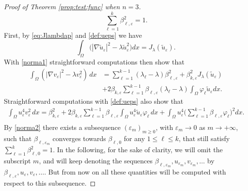 \documentclass[10pt]{amsart}
\numberwithin{equation}{section}
\newcommand{\ve}{\varepsilon}
\newcommand{\vp}{\varphi}
\newcommand{\Om}{\Omega}
\theoremstyle{plain}
\theoremstyle{remark}
\begin{document}
\begin{proof}[Proof of Theorem \ref{prop:test:func} when $n=3$]
\begin{equation} \label{norma2}
\sum_{\ell=1}^{k}\beta_{\ell,\ve}^2=1.
\end{equation}
First, by \eqref{eq:Jlambdap} and \eqref{def:ueps}  we have 
$$  \int_{\Omega}\big( |\nabla \tilde{u}_\ve|^2 - \lambda \tilde{u}_\ve^2 \big) dx = J_\lambda (\tilde{u}_\ve). $$
With  \eqref{norma1} straightforward computations then show that
\begin{equation} \label{test:est1}
\begin{aligned}
  \int_{\Om} \left( |\nabla v_\ve|^2-\lambda v_\ve^2\right)\, dx & = \sum_{\ell=1}^{k-1} (\lambda_\ell - \lambda) \beta_{\ell,\ve}^2+ \beta_{k, \ve}^2 J_{\lambda}(\tilde{u}_\ve) \\
& + 2 \beta_{k,\ve}\sum_{\ell=1}^{k-1}  \beta_{\ell,\ve}(\lambda_\ell - \lambda) \int_{\Om} \vp_\ell \tilde{u}_\ve dx .
\end{aligned} 
\end{equation}
Straightforward computations with \eqref{def:ueps} also show that 
\begin{equation} \label{test:est2:2}
\begin{aligned}
	\int_{\Om} u_{\ve}^{4}v_{\ve}^2\, dx =  \beta_{k, \ve}^2 + 2\beta_{k,\ve}\sum_{\ell=1}^{k-1}\beta_{\ell,\ve} \int_{\Om} u_{\ve}^{4} \tilde{u}_\ve \varphi_{\ell}\, dx +  \int_{\Om} u_\ve^{4}\Big( \sum_{\ell=1}^{k-1} \beta_{\ell,\ve} \vp_\ell \Big)^2dx. \\
	\end{aligned} 
\end{equation}
By \eqref{norma2} there exists a subsequence $(\ve_m)_{m\ge 0}$, with $\ve_m \to 0$ as $m \to + \infty$, such that $\beta_{\ell,\ve_m}$ converges towards $\beta_{\ell,0}$ for any $1 \le \ell \le k$, that still satisfy $\sum_{\ell=1}^k \beta_{\ell,0}^2 = 1$. In the following, for the sake of clarity, we will omit the subscript $m$, and will keep denoting the sequences $\beta_{\ell,\ve_m}, u_{\ve_m}, v_{\ve_m}, \dots$ by $\beta_{\ell,\ve}, u_\ve, v_\ve, \dots$. But from now on all these quantities will be computed with respect to this subsequence. 

\medskip


\end{proof}
\end{document}

